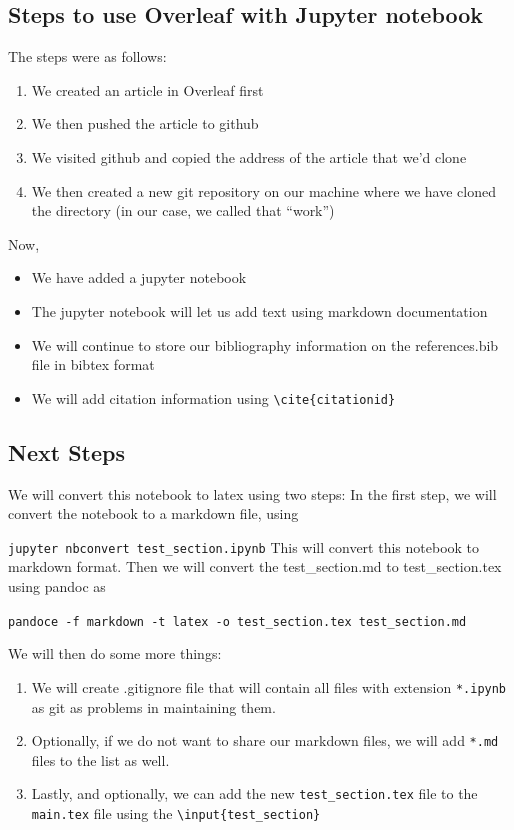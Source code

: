 \subsection{Steps to use Overleaf with Jupyter
notebook}\label{steps-to-use-overleaf-with-jupyter-notebook}

The steps were as follows:

\begin{enumerate}
\def\labelenumi{\arabic{enumi}.}
\tightlist
\item
  We created an article in Overleaf first
\item
  We then pushed the article to github
\item
  We visited github and copied the address of the article that we'd
  clone
\item
  We then created a new git repository on our machine where we have
  cloned the directory (in our case, we called that ``work'')
\end{enumerate}

Now,

\begin{itemize}
\tightlist
\item
  We have added a jupyter notebook
\item
  The jupyter notebook will let us add text using markdown documentation
\item
  We will continue to store our bibliography information on the
  references.bib file in bibtex format
\item
  We will add citation information using
  \texttt{\textbackslash{}cite\{citationid\}}
\end{itemize}

\subsection{Next Steps}\label{next-steps}

We will convert this notebook to latex using two steps: In the first
step, we will convert the notebook to a markdown file, using

\texttt{jupyter\ nbconvert\ test\_section.ipynb} This will convert this
notebook to markdown format. Then we will convert the test\_section.md
to test\_section.tex using pandoc as

\texttt{pandoce\ -f\ markdown\ -t\ latex\ -o\ test\_section.tex\ test\_section.md}

We will then do some more things:

\begin{enumerate}
\def\labelenumi{\arabic{enumi}.}
\tightlist
\item
  We will create .gitignore file that will contain all files with
  extension \texttt{*.ipynb} as git as problems in maintaining them.
\item
  Optionally, if we do not want to share our markdown files, we will add
  \texttt{*.md} files to the list as well.
\item
  Lastly, and optionally, we can add the new \texttt{test\_section.tex}
  file to the \texttt{main.tex} file using the
  \texttt{\textbackslash{}input\{test\_section\}}
\end{enumerate}

